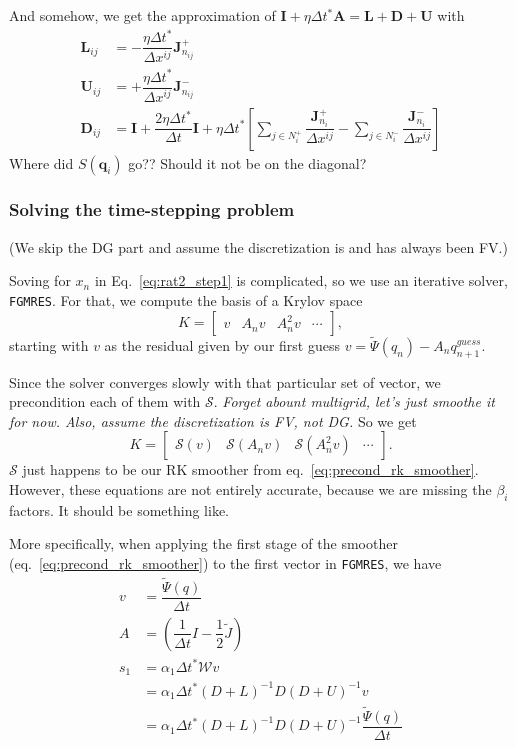 \documentclass[12pt]{article}
\begin{document}
And somehow, we get the approximation of $\bm{I} + \eta\Delta t^*\bm{A} = \bm{L} + \bm{D} + \bm{U}$ with
\begin{align}
    \bm{L}_{ij} &= - \dfrac{\eta\Delta t^*}{\Delta x^{ij}} \bm{J}^+_{n_{ij}} \\
    \bm{U}_{ij} &= + \dfrac{\eta\Delta t^*}{\Delta x^{ij}} \bm{J}^-_{n_{ij}} \\
    \bm{D}_{ij} &= \bm{I}  +  \dfrac{2\eta\Delta t^*}{\Delta t}\bm{I}
                    +
                    \eta\Delta t^* \left[ \sum_{j \in N_i^+} \dfrac{\bm{J}^+_{n_i}}{\Delta x^{ij}}
                    - \sum_{j \in N_i^-} \dfrac{\bm{J}^-_{n_i}}{\Delta x^{ij}} \right]
\end{align}
Where did $S(\bm{q}_i)$ go?? Should it not be on the diagonal?

\subsubsection{Solving the time-stepping problem}

(We skip the DG part and assume the discretization is and has always been FV.)

Soving for $x_n$ in Eq.~\ref{eq:rat2_step1} is complicated, so we use an iterative solver, \texttt{FGMRES}. For that, we compute the basis of a Krylov space
$$K = \left[\begin{matrix} v & A_n v & A_n^2 v & \cdots \end{matrix}\right],$$
 starting with $v$ as the residual given by our first guess
$ v = \tilde{\Psi}(q_n) - A_n q_{n+1}^{guess}$.

Since the solver converges slowly with that particular set of vector, we precondition each of them with $\mathcal{S}$. \emph{Forget abount multigrid, let's just smoothe it for now. Also, assume the discretization is FV, not DG.} So we get 
$$K = \left[\begin{matrix} \mathcal{S}(v) & \mathcal{S}(A_n v) & \mathcal{S}(A_n^2 v) & \cdots \end{matrix}\right].$$
$\mathcal{S}$ just happens to be our RK smoother from eq.~\ref{eq:precond_rk_smoother}. However, these equations are not entirely accurate, because we are missing the $\beta_i$ factors. It should be something like.

More specifically, when applying the first stage of the smoother (eq.~\ref{eq:precond_rk_smoother}) to the first vector in \texttt{FGMRES}, we have
\begin{align}
    v &= \dfrac{\tilde{\Psi}(q)}{\Delta t} \\
    A &= \left( \dfrac{1}{\Delta t} I - \dfrac{1}{2} \tilde{J} \right) \\
    s_1 &= \alpha_1 \Delta t^* \mathcal{W}v \\
        &= \alpha_1 \Delta t^* (D + L)^{-1} D (D + U)^{-1} v \\
        &= \alpha_1 \Delta t^* (D + L)^{-1} D (D + U)^{-1} \dfrac{\tilde{\Psi}(q)}{\Delta t}
\end{align}
\end{document}
